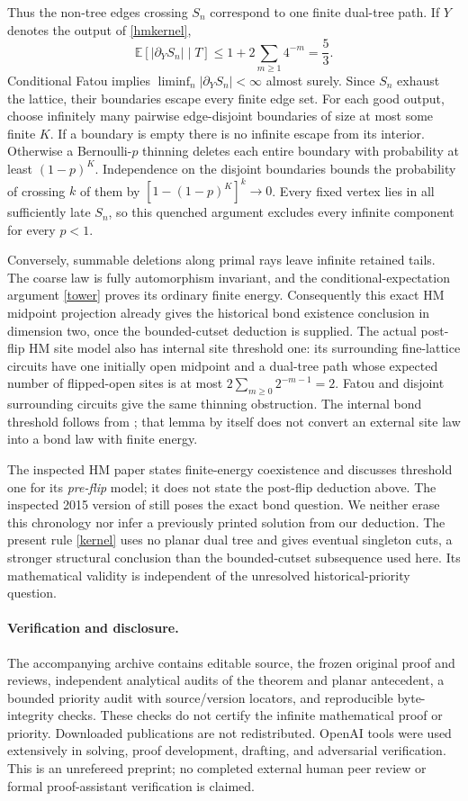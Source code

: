 \documentclass[11pt]{article}
\newcommand{\E}{\mathbb E}
\newcommand{\bd}{\partial}
\begin{document}
Thus the non-tree edges crossing $S_n$ correspond to one finite dual-tree path. If $Y$ denotes the output of \eqref{hmkernel},
\[
 \E[|\bd_Y S_n|\mid T]
 \le 1+2\sum_{m\ge1}4^{-m}=\frac53.
\]
Conditional Fatou implies $\liminf_n|\bd_Y S_n|<\infty$ almost surely. Since $S_n$ exhaust the lattice, their boundaries escape every finite edge set. For each good output, choose infinitely many pairwise edge-disjoint boundaries of size at most some finite $K$. If a boundary is empty there is no infinite escape from its interior. Otherwise a Bernoulli-$p$ thinning deletes each entire boundary with probability at least $(1-p)^K$. Independence on the disjoint boundaries bounds the probability of crossing $k$ of them by $[1-(1-p)^K]^k\to0$. Every fixed vertex lies in all sufficiently late $S_n$, so this quenched argument excludes every infinite component for every $p<1$.

Conversely, summable deletions along primal rays leave infinite retained tails. The coarse law is fully automorphism invariant, and the conditional-expectation argument \eqref{tower} proves its ordinary finite energy. Consequently this exact HM midpoint projection already gives the historical bond existence conclusion in dimension two, once the bounded-cutset deduction is supplied. The actual post-flip HM site model also has internal site threshold one: its surrounding fine-lattice circuits have one initially open midpoint and a dual-tree path whose expected number of flipped-open sites is at most $2\sum_{m\ge0}2^{-m-1}=2$. Fatou and disjoint surrounding circuits give the same thinning obstruction. The internal bond threshold follows from \cite[Lemma 3.1]{HM}; that lemma by itself does not convert an external site law into a bond law with finite energy.

The inspected HM paper states finite-energy coexistence and discusses threshold one for its \emph{pre-flip} model; it does not state the post-flip deduction above. The inspected 2015 version of \cite{BT} still poses the exact bond question. We neither erase this chronology nor infer a previously printed solution from our deduction. The present rule \eqref{kernel} uses no planar dual tree and gives eventual singleton cuts, a stronger structural conclusion than the bounded-cutset subsequence used here. Its mathematical validity is independent of the unresolved historical-priority question.

\paragraph{Verification and disclosure.}
The accompanying archive contains editable source, the frozen original proof and reviews, independent analytical audits of the theorem and planar antecedent, a bounded priority audit with source/version locators, and reproducible byte-integrity checks. These checks do not certify the infinite mathematical proof or priority. Downloaded publications are not redistributed. OpenAI tools were used extensively in solving, proof development, drafting, and adversarial verification. This is an unrefereed preprint; no completed external human peer review or formal proof-assistant verification is claimed.
\end{document}

